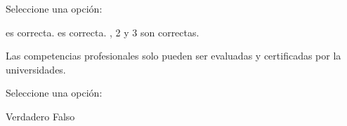 \documentclass[a4paper]{exam}
\begin{document}
\begin{questions}
  Seleccione una opción:

  \begin{choices}
     es correcta.
     es correcta.
    , 2 y 3 son correctas.
  \end{choices}

  \question Las competencias profesionales solo pueden ser evaluadas y
  certificadas por la universidades.

  Seleccione una opción:

  \begin{choices}
    \choice Verdadero
    \CorrectChoice Falso
  \end{choices}
  
\end{questions}
\end{document}
